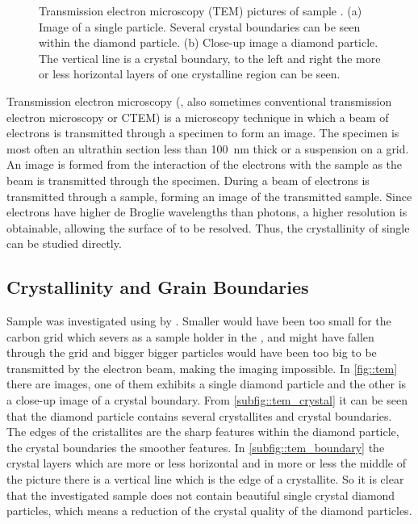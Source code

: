 \begin{figure}[htp]
\begin{subfigure}[t]{ 0.49\linewidth}
					\label{subfig::tem_boundary}
				\end{subfigure}
				\caption[\TEM imaging of a single \nd]{Transmission electron microscopy (TEM) pictures of sample \insituH. (a) Image of a single \nd particle. Several crystal boundaries can be seen within the diamond particle. (b) Close-up image a diamond particle. The vertical line is a crystal boundary, to the left and right the more or less horizontal layers of one crystalline region can be seen.}
				\label{fig::tem}
			\end{figure}

			Transmission electron microscopy (\TEM, also sometimes conventional transmission electron microscopy or CTEM) is a microscopy technique in which a beam of electrons is transmitted through a specimen to form an image. The specimen is most often an ultrathin section less than \SI{100}{\nm} thick or a suspension on a grid. An image is formed from the interaction of the electrons with the sample as the beam is transmitted through the specimen.
			During \tem a beam of electrons is transmitted through a sample, forming an image of the transmitted sample.
			Since electrons have higher de Broglie wavelengths than photons, a higher resolution is obtainable, allowing the surface of \nds to be resolved. Thus, the crystallinity of single \nds can be studied directly.

			\subsection{Crystallinity and Grain Boundaries}\label{subsection::tem_crystal}

				Sample \insituH was investigated using \TEM by \schmauch.
				Smaller \nds would have been too small for the carbon grid which severs as a sample holder in the \TEM, and might have fallen through the grid and bigger bigger particles would have been too big to be transmitted by the electron beam, making the imaging impossible.
				In \autoref{fig::tem} there are \TEM images, one of them exhibits a single diamond particle and the other is a close-up image of a crystal boundary.
				From \autoref{subfig::tem_crystal} it can be seen that the diamond particle contains several crystallites and crystal boundaries.
				The edges of the cristallites are the sharp features within the diamond particle, the crystal boundaries the smoother features.
				In \autoref{subfig::tem_boundary} the crystal layers which are more or less horizontal and in more or less the middle of the picture there is a vertical line which is the edge of a crystallite.
				So it is clear that the investigated sample does not contain beautiful single crystal diamond particles, which means a reduction of the crystal quality of the diamond particles.
